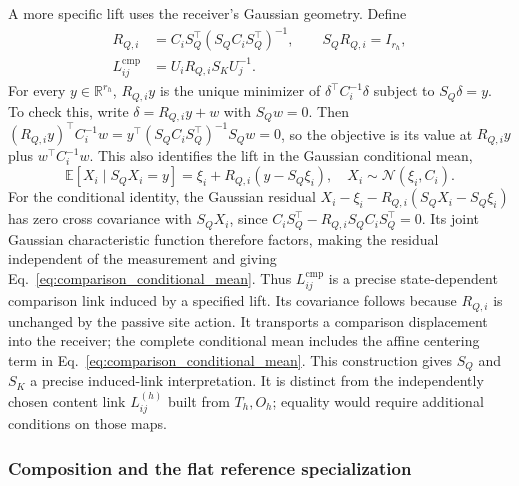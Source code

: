 \documentclass[twoside,11pt]{article}
\begin{document}
A more specific lift uses the receiver's Gaussian geometry. Define
\begin{align}
R_{Q,i}&=C_iS_Q^\top(S_QC_iS_Q^\top)^{-1},\qquad S_QR_{Q,i}=I_{r_h},\\
L_{ij}^{\mathrm{cmp}}
&=U_iR_{Q,i}S_KU_j^{-1}.
\label{eq:comparison_gaussian_lift}
\end{align}
For every $y\in\mathbb R^{r_h}$, $R_{Q,i}y$ is the unique minimizer of $\delta^\top C_i^{-1}\delta$ subject to $S_Q\delta=y$. To check this, write $\delta=R_{Q,i}y+w$ with $S_Qw=0$. Then $(R_{Q,i}y)^\top C_i^{-1}w=y^\top(S_QC_iS_Q^\top)^{-1}S_Qw=0$, so the objective is its value at $R_{Q,i}y$ plus $w^\top C_i^{-1}w$. This also identifies the lift in the Gaussian conditional mean,
\begin{equation}
\mathbb E[X_i\mid S_QX_i=y]
=\xi_i+R_{Q,i}(y-S_Q\xi_i),
\quad X_i\sim\mathcal N(\xi_i,C_i).
\label{eq:comparison_conditional_mean}
\end{equation}
For the conditional identity, the Gaussian residual $X_i-\xi_i-R_{Q,i}(S_QX_i-S_Q\xi_i)$ has zero cross covariance with $S_QX_i$, since $C_iS_Q^\top-R_{Q,i}S_QC_iS_Q^\top=0$. Its joint Gaussian characteristic function therefore factors, making the residual independent of the measurement and giving Eq.~\eqref{eq:comparison_conditional_mean}. Thus $L_{ij}^{\mathrm{cmp}}$ is a precise state-dependent comparison link induced by a specified lift. Its covariance follows because $R_{Q,i}$ is unchanged by the passive site action. It transports a comparison displacement into the receiver; the complete conditional mean includes the affine centering term in Eq.~\eqref{eq:comparison_conditional_mean}. This construction gives $S_Q$ and $S_K$ a precise induced-link interpretation. It is distinct from the independently chosen content link $L_{ij}^{(h)}$ built from $T_h,O_h$; equality would require additional conditions on those maps.

\subsubsection{Composition and the flat reference specialization}
\label{sec:flat_identification}
\end{document}
